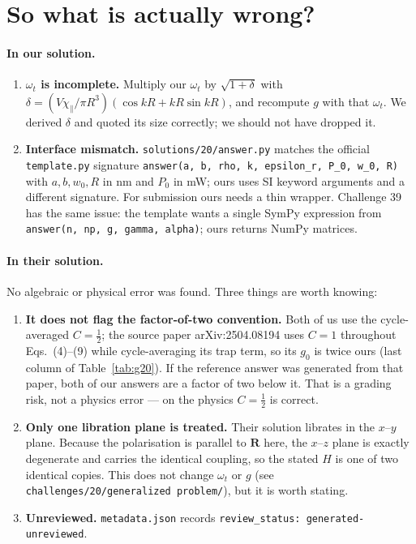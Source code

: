 \documentclass[11pt,a4paper]{article}
\begin{document}
\section{So what is actually wrong?}

\paragraph{In our solution.}
\begin{enumerate}\itemsep2pt
\item \textbf{$\omega_t$ is incomplete.}  Multiply our $\omega_t$ by
$\sqrt{1+\delta}$ with $\delta=(V\chi_{\parallel}/\pi R^{3})(\cos kR+kR\sin
kR)$, and recompute $g$ with that $\omega_t$.  We derived $\delta$ and quoted
its size correctly; we should not have dropped it.
\item \textbf{Interface mismatch.}  \texttt{solutions/20/answer.py} matches the
official \texttt{template.py} signature
\texttt{answer(a, b, rho, k, epsilon\_r, P\_0, w\_0, R)} with $a,b,w_0,R$ in
nm and $P_0$ in mW; ours uses SI keyword arguments and a different signature.
For submission ours needs a thin wrapper.  Challenge 39 has the same issue:
the template wants a single SymPy expression from
\texttt{answer(n, np, g, gamma, alpha)}; ours returns NumPy matrices.
\end{enumerate}

\paragraph{In their solution.}
No algebraic or physical error was found.  Three things are worth knowing:
\begin{enumerate}\itemsep2pt
\item \textbf{It does not flag the factor-of-two convention.}  Both of us use
the cycle-averaged $C=\tfrac12$; the source paper arXiv:2504.08194 uses $C=1$
throughout Eqs.~(4)--(9) while cycle-averaging its trap term, so its $g_0$ is
twice ours (last column of Table~\ref{tab:g20}).  If the reference answer was
generated from that paper, both of our answers are a factor of two below it.
That is a grading risk, not a physics error --- on the physics $C=\tfrac12$ is
correct.
\item \textbf{Only one libration plane is treated.}  Their solution librates in
the $x$--$y$ plane.  Because the polarisation is parallel to $\mathbf R$ here,
the $x$--$z$ plane is exactly degenerate and carries the identical coupling, so
the stated $H$ is one of two identical copies.  This does not change $\omega_t$
or $g$ (see \texttt{challenges/20/generalized problem/}), but it is worth
stating.
\item \textbf{Unreviewed.}  \texttt{metadata.json} records
\texttt{review\_status: generated-unreviewed}.
\end{enumerate}
\end{document}
